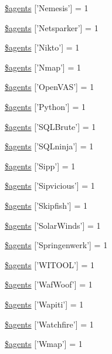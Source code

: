 \begin{DoxyCompactItemize}
\item 
\hyperlink{agents_8php_a43fb49ecebc2d01e60f716f66f125b70}{\$agents} \mbox{[}'Nemesis'\mbox{]} = 1
\item 
\hyperlink{agents_8php_a9266c5fc2d80e6e54c419b6aaa06487e}{\$agents} \mbox{[}'Netsparker'\mbox{]} = 1
\item 
\hyperlink{agents_8php_a90c59b5719baa1cb102c7dd820f28e61}{\$agents} \mbox{[}'Nikto'\mbox{]} = 1
\item 
\hyperlink{agents_8php_a6c369038b4d690edeffa8621b897acc0}{\$agents} \mbox{[}'Nmap'\mbox{]} = 1
\item 
\hyperlink{agents_8php_accce65048167d00a453b8d716016f364}{\$agents} \mbox{[}'Open\-V\-A\-S'\mbox{]} = 1
\item 
\hyperlink{agents_8php_a8311b49c2a38df88d9a5739df1e88f30}{\$agents} \mbox{[}'Python'\mbox{]} = 1
\item 
\hyperlink{agents_8php_aa652aac21e20a569779a9abca9513701}{\$agents} \mbox{[}'S\-Q\-L\-Brute'\mbox{]} = 1
\item 
\hyperlink{agents_8php_a5bf2813e2ddf38c389438a6c8acdb922}{\$agents} \mbox{[}'S\-Q\-Lninja'\mbox{]} = 1
\item 
\hyperlink{agents_8php_a4b5d9c86ce0e36d96fb7d26559b4de29}{\$agents} \mbox{[}'Sipp'\mbox{]} = 1
\item 
\hyperlink{agents_8php_ad06c87717ebedfc7c6b8b62e128af403}{\$agents} \mbox{[}'Sipvicious'\mbox{]} = 1
\item 
\hyperlink{agents_8php_aef1ba3d6f2a995373f6bd2710468f2e4}{\$agents} \mbox{[}'Skipfish'\mbox{]} = 1
\item 
\hyperlink{agents_8php_a80a655fb665ff06612df773049d886d6}{\$agents} \mbox{[}'Solar\-Winds'\mbox{]} = 1
\item 
\hyperlink{agents_8php_aa6f3ca826e3bcd3042ad50f23db715fb}{\$agents} \mbox{[}'Springenwerk'\mbox{]} = 1
\item 
\hyperlink{agents_8php_adf3d5815954d1610b0cdc03f9aea9d91}{\$agents} \mbox{[}'W\-I\-T\-O\-O\-L'\mbox{]} = 1
\item 
\hyperlink{agents_8php_aa257cf1f0f035c036d595e7d0f097b85}{\$agents} \mbox{[}'Waf\-Woof'\mbox{]} = 1
\item 
\hyperlink{agents_8php_a008fbe5121b72210c7b2c2e8f77cb001}{\$agents} \mbox{[}'Wapiti'\mbox{]} = 1
\item 
\hyperlink{agents_8php_a461fd695dd6d0661782e47c316df5168}{\$agents} \mbox{[}'Watchfire'\mbox{]} = 1
\item 
\hyperlink{agents_8php_ad61070b8062e8f841eabf3e364023f91}{\$agents} \mbox{[}'Wmap'\mbox{]} = 1

\end{DoxyCompactItemize}
